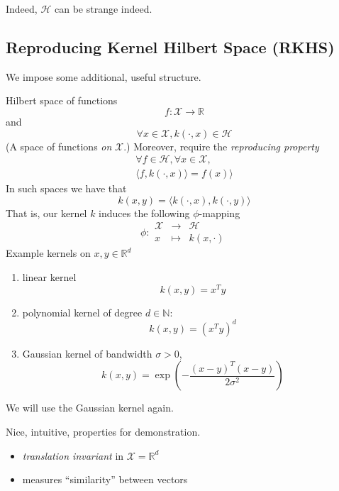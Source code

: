 Indeed, $\mathcal{H}$ can be strange indeed.
\clearpage
\subsection*{Reproducing Kernel Hilbert Space (RKHS)}
We impose some additional, useful structure.

Hilbert space of functions
\begin{equation*}
f: \mathcal{X} \rightarrow \mathbb{R}
\end{equation*}
 and 
\begin{equation*}
\forall x \in \mathcal{X}, k(\cdot, x) \in \mathcal{H}
\end{equation*}
(A space of functions \emph{on} $\mathcal{X}$.)
\clearpage
Moreover,  require the \emph{reproducing property}
\begin{align*}
\forall f \in \mathcal{H}, \forall x \in \mathcal{X},\\
\langle f, k(\cdot,x)\rangle = f(x)\rangle
\end{align*}
In such spaces we have that 
\begin{equation*}
k(x,y) = \langle k(\cdot, x), k(\cdot, y) \rangle
\end{equation*}
\clearpage
That is, our kernel $k$ induces the following $\phi$-mapping
\begin{equation*}
\phi: \begin{matrix}
        \mathcal{X}  &\rightarrow &\mathcal{H}\\
        x &\mapsto &k(x,\cdot)
        \end{matrix}
\end{equation*}
\clearpage
Example kernels on $x, y \in \mathbb{R}^d$
\begin{enumerate}
\item linear kernel \[k(x, y) = x^Ty\]
\item polynomial kernel of degree $d\in \mathbb{N}$: \[k(x, y) = (x^Ty)^d\]
\item Gaussian kernel of bandwidth $\sigma>0$, \[k(x,y) = \exp\left(-\frac{(x-y)^T(x-y)}{2\sigma^2}\right)\]
\end{enumerate}
\clearpage
We will use the Gaussian kernel again.

Nice, intuitive, properties for demonstration.

\begin{itemize}
\item \emph{translation invariant} in $\mathcal{X}=\mathbb{R}^d$
\item measures ``similarity'' between vectors
\end{itemize}
\clearpage
